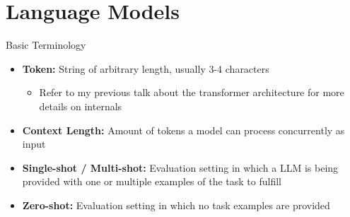 \section{Language Models}

\begin{frame}[c]{Basic Terminology}
    \large
    \begin{itemize}[<+(1)->]
        \item   \textbf{Token:} String of arbitrary length, usually 3-4 characters
            \begin{itemize}
                \item Refer to my previous talk about the transformer architecture for more details on internals
            \end{itemize}
        \item   \textbf{Context Length:} Amount of tokens a model can process concurrently as input
        \item   \textbf{Single-shot / Multi-shot:} Evaluation setting in which a \gls{LLM} is being provided with one or multiple examples of the task to fulfill
        \item   \textbf{Zero-shot:} Evaluation setting in which no task examples are provided
    \end{itemize}
\end{frame}


